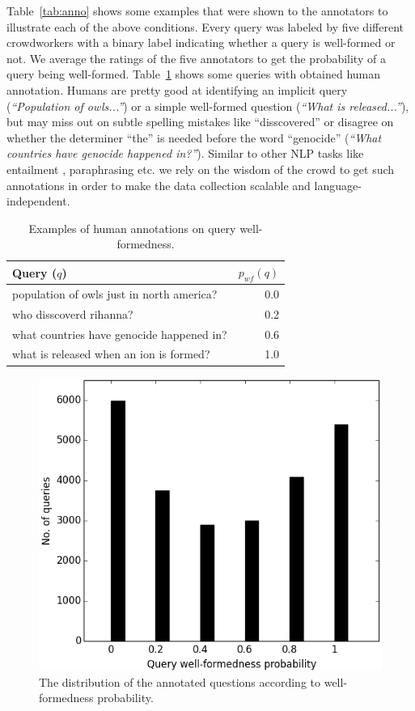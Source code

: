 \documentclass[11pt,a4paper]{article}
\begin{document}
Table~\ref{tab:anno} shows some examples that were shown to the annotators
to illustrate each of the above conditions. Every query was labeled by five
different crowdworkers with a binary label indicating whether a query is
well-formed or not. We average the ratings of the five annotators to
get the probability of a query being well-formed. 
Table~\ref{tab:labeledqueries} shows some queries with obtained human annotation.
Humans are pretty good at identifying an implicit query (\textit{``Population of
owls...''}) or a simple well-formed question (\textit{``What is released...''}), but
may miss out on subtle spelling mistakes like ``disscovered'' or disagree on
whether the determiner ``the'' is needed before the word ``genocide'' (\textit{``What countries have genocide happened in?''}).
Similar to other NLP tasks like entailment \cite{dagan2006pascal,bowman:2015}, 
paraphrasing \cite{meandev} etc. we rely on the wisdom of the
crowd to get such annotations in order to make the
data collection scalable and language-independent.

\begin{table}[!tb]
\centering
\begin{tabular}{|p{5.5cm}|r|}
\hline
Query ($q$) & $p_{wf}(q)$ \\
\hline
population of owls just in north america? & 0.0 \\
who disscoverd rihanna? & 0.2 \\
what countries have genocide happened in? & 0.6 \\
what is released when an ion is formed? & 1.0 \\
\hline
\end{tabular}
\label{tab:labeledqueries}
\caption{Examples of human annotations on query well-formedness.}
\end{table}

\begin{figure}[!tb]
    \centering
    \includegraphics[scale=0.4]{dist.png}
    \caption{The distribution of the annotated questions according
    to well-formedness probability.}
    \label{fig:dist}
\end{figure}
\end{document}
